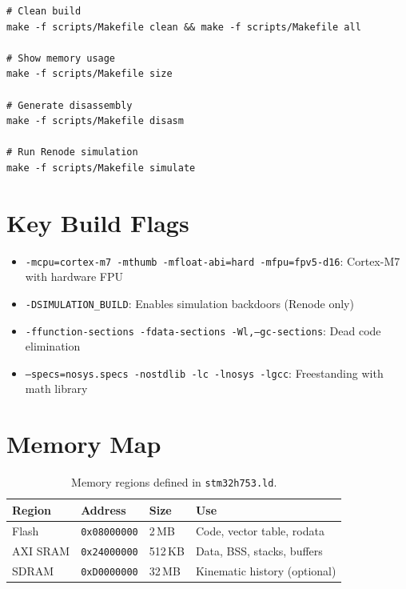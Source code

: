 \begin{lstlisting}[style=plainstyle]
# Clean build
make -f scripts/Makefile clean && make -f scripts/Makefile all

# Show memory usage
make -f scripts/Makefile size

# Generate disassembly
make -f scripts/Makefile disasm

# Run Renode simulation
make -f scripts/Makefile simulate
\end{lstlisting}

\section{Key Build Flags}

\begin{itemize}
\item \texttt{-mcpu=cortex-m7 -mthumb -mfloat-abi=hard -mfpu=fpv5-d16}: Cortex-M7 with hardware FPU
\item \texttt{-DSIMULATION\_BUILD}: Enables simulation backdoors (Renode only)
\item \texttt{-ffunction-sections -fdata-sections -Wl,--gc-sections}: Dead code elimination
\item \texttt{--specs=nosys.specs -nostdlib -lc -lnosys -lgcc}: Freestanding with math library
\end{itemize}

\section{Memory Map}

\begin{table}[htbp]
\centering
\caption{Memory regions defined in \texttt{stm32h753.ld}.}
\label{tab:A:memory}
\begin{tabular}{@{}llll@{}}
\toprule
\textbf{Region} & \textbf{Address} & \textbf{Size} & \textbf{Use} \\
\midrule
Flash & \texttt{0x08000000} & 2\,MB & Code, vector table, rodata \\
AXI SRAM & \texttt{0x24000000} & 512\,KB & Data, BSS, stacks, buffers \\
SDRAM & \texttt{0xD0000000} & 32\,MB & Kinematic history (optional) \\
\bottomrule
\end{tabular}
\end{table}